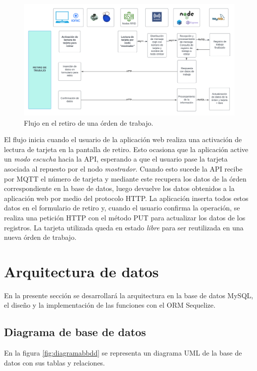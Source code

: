 \begin{figure}[ht]
	\centering
	\includegraphics[scale=.10]{./Figures/flujo-retiro.png}
	\caption{Flujo en el retiro de una órden de trabajo.}
	\label{fig:flujoretiro}
\end{figure}

El flujo inicia cuando el usuario de la aplicación web realiza una activación de lectura de tarjeta en la pantalla de retiro. Esto ocasiona que la aplicación active un \textit{modo escucha} hacia la API, esperando a que el usuario pase la tarjeta asociada al repuesto por el nodo \textit{mostrador}. Cuando esto sucede la API recibe por MQTT el número de tarjeta y mediante este recupera los datos de la órden correspondiente en la base de datos, luego devuelve los datos obtenidos a la aplicación web por medio del protocolo HTTP. La aplicación inserta todos estos datos en el formulario de retiro y, cuando el usuario confirma la operación, se realiza una petición HTTP con el método PUT para actualizar los datos de los registros. La tarjeta utilizada queda en estado \textit{libre} para ser reutilizada en una nueva órden de trabajo.

\section{Arquitectura de datos}
\label{sec:arquitecturadatos}
En la presente sección se desarrollará la arquitectura en la base de datos MySQL, el diseño y la implementación de las funciones con el ORM Sequelize.

\subsection{Diagrama de base de datos}
\label{subsec:diagramabasededatos}

En la figura \ref{fig:diagramabbdd} se representa un diagrama UML de la base de datos con sus tablas y relaciones.

